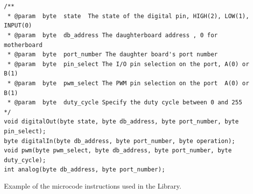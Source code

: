 	\begin{listing}
		\footnotesize
		\begin{verbatim}
	

/**
 * @param  byte  state  The state of the digital pin, HIGH(2), LOW(1), INPUT(0)
 * @param  byte  db_address The daughterboard address , 0 for motherboard 
 * @param  byte  port_number The daughter board's port number
 * @param  byte  pin_select The I/O pin selection on the port, A(0) or B(1)
 * @param  byte  pwm_select The PWM pin selection on the port  A(0) or B(1)
 * @param  byte  duty_cycle Specify the duty cycle between 0 and 255
*/
void digitalOut(byte state, byte db_address, byte port_number, byte pin_select);
byte digitalIn(byte db_address, byte port_number, byte operation);
void pwm(byte pwm_select, byte db_address, byte port_number, byte duty_cycle);
int analog(byte db_address, byte port_number);

		\end{verbatim}
		\caption{Example of the \xten microcode instructions used in the Library.} \label{code:micro}
	\end{listing}

